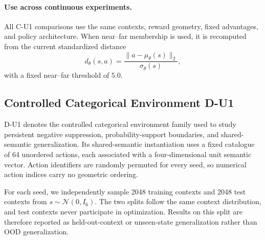 \documentclass{article}
\theoremstyle{plain}
\theoremstyle{definition}
\theoremstyle{remark}
\begin{document}
\paragraph{Use across continuous experiments.}
All C-U1 comparisons use the same contexts, reward geometry, fixed advantages,
and policy architecture. When near--far membership is used, it is recomputed
from the current standardized distance
\begin{equation}
    d_\theta(s,a)
    =
    \frac{
        \lVert a-\mu_\theta(s)\rVert_2
    }{
        \sigma_\theta(s)
    },
    \label{eq:cu1_standardized_distance}
\end{equation}
with a fixed near--far threshold of $5.0$.

\subsection{Controlled Categorical Environment D-U1}
\label{app:du1_environment}

D-U1 denotes the controlled categorical environment family used to
study persistent negative suppression, probability-support boundaries,
and shared-semantic generalization. Its shared-semantic instantiation uses a
fixed catalogue of 64 unordered actions, each associated with a
four-dimensional unit semantic vector. Action identifiers are randomly
permuted for every seed, so numerical action indices carry no geometric
ordering.

For each seed, we independently sample 2048 training contexts and 2048
test contexts from
$s\sim\mathcal N(0,I_6)$.
The two splits follow the same context distribution, and test contexts
never participate in optimization. Results on this split are therefore
reported as held-out-context or unseen-state generalization rather than
OOD generalization.
\end{document}
